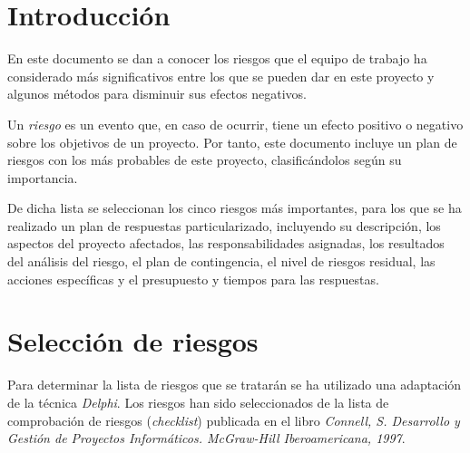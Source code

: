 \documentclass[11pt,a4paper,spanish,twoside]{book}
\begin{document}
\tableofcontents
\listoftables

\chapter*{Introducción}
En este documento se dan a conocer los riesgos que el equipo de trabajo ha
considerado más significativos entre los que se pueden dar en este proyecto y
algunos métodos para disminuir sus efectos negativos.

Un \emph{riesgo} es un evento que, en caso de ocurrir, tiene un efecto
positivo o negativo sobre los objetivos de un proyecto. Por tanto, este
documento incluye un plan de riesgos con los más probables de este
proyecto, clasificándolos según su importancia.

De dicha lista se  seleccionan los cinco riesgos más importantes, para los
que se ha realizado un plan de respuestas particularizado, incluyendo su 
descripción, los aspectos del proyecto afectados, las responsabilidades 
asignadas, los resultados del análisis del riesgo, el plan de contingencia,
el nivel de riesgos residual, las acciones específicas y el presupuesto y 
tiempos para las respuestas.

\chapter{Selección de riesgos}
Para determinar la lista de riesgos que se tratarán se ha utilizado una
adaptación de la técnica \emph{Delphi}. Los riesgos han sido seleccionados de
la lista de comprobación de riesgos (\emph{checklist}) publicada en el libro 
\emph{Connell, S. Desarrollo y Gestión de Proyectos Informáticos. McGraw-Hill
Iberoamericana, 1997}.
\end{document}
